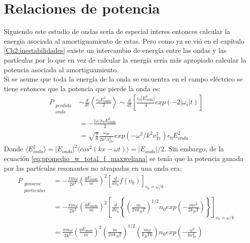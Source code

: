 \documentclass[../tesis_main_file.tex]{subfiles}
\begin{document}
\section{Relaciones de potencia}
Siguiendo este estudio de ondas sería de especial interes entonces calcular la energía asociada al amortiguamiento de estas.
Pero como ya se vió en el capítulo \ref{Ch2:inestabilidades} existe un intercambio de energía entre las ondas  y las partículas por lo que en vez de calcular la energía sería más apropiado calcular la potencia asociada al amortiguamiento.\\
Si se asume que toda la energía de la onda se encuentra en el campo eléctrico se tiene entonces que la potencia que pierde la onda es:
\begin{equation}
\label{eq:potencia_perdida-onda_Landau}
\begin{split}
P_{\substack{perdida\\onda}}&\sim\frac{d}{dt}\left\langle \frac{\epsilon_0 E^2_{onda}}{2}\right\rangle \sim \frac{d}{dt}\left[\frac{\epsilon_0|E^2_{onda}|}{4}exp(-2|\omega_i|t)\right]\\
&=-\frac{|\omega_i|\epsilon_0 E^2_{onda}}{2}\\
&=\sqrt{\frac{\pi}{8}}\frac{\omega_{pe}}{2k^3\lambda^3_{De}}exp\left(-\omega^2/k^2v^2_{Te}\right)\epsilon_0 E^2_{onda}
\end{split}
\end{equation}
Donde $\langle E^2_{onda}\rangle =|E_{onda}|^2\langle cos^2(kx-\omega t)\rangle =|E_{onda}|/2$. Sin embargo, de la ecuación \ref{eq:promedio_w_total_f_maxweliana} se tenía que la potencia ganada por las partículas resonantes no atrapadas en una onda era:
\begin{equation}
\label{eq:P_ganada_particulas_Landau}
\begin{split}
P_{\substack{ganacia\\particulas} } &=-\frac{\pi m \omega }{2k^2} \left( \frac{q E_{onda}}{m} \right) ^2 \left[ \frac{d}{dv_0}f(v_0) \right]_{v_0=\omega / k} \\
&=-\frac{\pi m \omega}{2k^2}\left( \frac{qE_{onda}}{m} \right)^2 \left[\frac{d}{dv_0} \left\lbrace \left(\frac{m}{2\pi k_BT} \right)^{1/2}n_0 exp\left( -\frac{mv^2}{2k_BT}\right) \right\rbrace \right]_{v_0= \omega /k}\\
&=\frac{\pi m \omega}{2k^2}\left(\frac{qE_{onda}}{m}\right)^2 \left( \frac{m}{2\pi k_BT} \right)^{1/2}\left( \frac{m \omega}{k_BTk}\right)n_0 exp \left(-\frac{\omega^2}{kv^2_{Te}}\right)
\end{split}
\end{equation}
\end{document}
